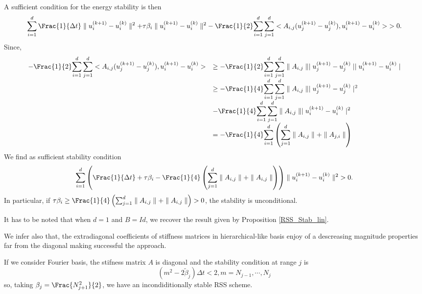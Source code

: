 {\begin{proof_amiens}
$$\begin{array}{ll}
\end{array}
$$
A sufficient condition for the energy stability is then
$$
\displaystyle{\sum_{i=1}^d\Frac{1}{\Delta t} \parallel u_i^{(k+1)}-u_i^{(k)} \parallel^2
+\tau \beta_i \parallel u_i^{(k+1)}-u_i^{(k)} \parallel^2}
-\Frac{1}{2}\displaystyle{\sum_{i=1}^d\sum_{j=1}^d<A_{i,j}(u_j^{(k+1)}-u_j^{(k)}),u_i^{(k+1)}-u_i^{(k)}>}>0.
$$
Since,
$$
\begin{array}{ll}
-\Frac{1}{2}
\displaystyle{\sum_{i=1}^d\sum_{j=1}^d<A_{i,j}(u_j^{(k+1)}-u_j^{(k)}),u_i^{(k+1)}-u_i^{(k)}>}
&\ge 
-\Frac{1}{2}
\displaystyle{\sum_{i=1}^d\sum_{j=1}^d\parallel A_{i,j}\parallel \mid u_j^{(k+1)}-u_j^{(k)}\mid \mid u_i^{(k+1)}-u_i^{(k)}\mid } \\
&\ge 
-\Frac{1}{4}
\displaystyle{\sum_{i=1}^d\sum_{j=1}^d\parallel A_{i,j}\parallel \mid u_j^{(k+1)}-u_j^{(k)}\mid^2}\\
&-\Frac{1}{4}\displaystyle{\sum_{i=1}^d\sum_{j=1}^d\parallel A_{i,j}\parallel \mid u_i^{(k+1)}-u_i^{(k)}\mid^2} \\
&=-\Frac{1}{4}
\displaystyle{\sum_{i=1}^d\left(\sum_{j=1}^d\parallel A_{i,j}\parallel  +\parallel A_{j,i}\parallel \right)}
\end{array}
$$
We find as sufficient stability condition
$$
\displaystyle{\sum_{i=1}^d\left(\Frac{1}{\Delta t}   +\tau \beta_i -\Frac{1}{4}\left(\sum_{j=1}^d\parallel A_{i,j}\parallel  +\parallel A_{i,j}\parallel\right)\right)\parallel u_i^{(k+1)}-u_i^{(k)} \parallel^2} >0.
$$
In particular, if $\tau \beta_i \ge \Frac{1}{4}\left(\sum_{j=1}^d\parallel A_{i,j}\parallel  +\parallel A_{i,j}\parallel\right)
>0$, the stability is unconditional.
\end{proof_amiens}


It has to be noted that when $d=1$ and $B=Id$, we recover the result given by Proposition \ref{RSS_Stab_lin}.

We infer also that, the extradiagonal coefficients of stiffness matrices in  hierarchical-like basis enjoy of a descreasing magnitude properties far from the diagonal making successful the approach.

If we consider Fourier basis, the stifness matrix $A$ is diagonal and the stability condition at range $j$ is
$$
(m^2-2{\tilde \beta}_j)\Delta t < 2, m=N_{j-1}, \cdots, N_{j}
$$
so, taking $\beta_j=\Frac{N^2_{j+1}}{2}$, we have an incondiditionally stable RSS scheme.


}
